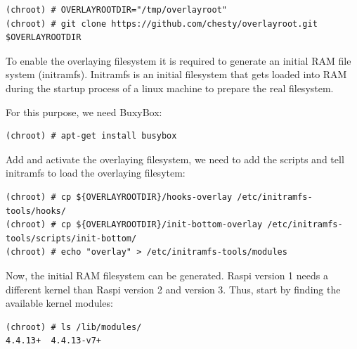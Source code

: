 \begin{lstlisting}[]
(chroot) # OVERLAYROOTDIR="/tmp/overlayroot"
(chroot) # git clone https://github.com/chesty/overlayroot.git $OVERLAYROOTDIR
\end{lstlisting}
\FloatBarrier
\vspace{-5mm}

To enable the overlaying filesystem it is required to generate an initial \ac{RAM}
file system (initramfs). Initramfs is an initial filesystem that gets loaded into
\ac{RAM} during the startup process of a linux machine to prepare the real
filesystem.

For this purpose, we need BuxyBox:

\begin{lstlisting}[]
(chroot) # apt-get install busybox
\end{lstlisting}
\FloatBarrier
\vspace{-5mm}

Add and activate the overlaying filesystem, we need to add the scripts and tell initramfs
to load the overlaying filesytem:

\begin{lstlisting}[]
(chroot) # cp ${OVERLAYROOTDIR}/hooks-overlay /etc/initramfs-tools/hooks/
(chroot) # cp ${OVERLAYROOTDIR}/init-bottom-overlay /etc/initramfs-tools/scripts/init-bottom/
(chroot) # echo "overlay" > /etc/initramfs-tools/modules
\end{lstlisting}
\FloatBarrier
\vspace{-5mm}

Now, the initial \ac{RAM} filesystem can be generated. \ac{Raspi} version 1
needs a different kernel than \ac{Raspi} version 2 and version 3. Thus, start
by finding the available kernel modules:


\begin{lstlisting}[]
(chroot) # ls /lib/modules/
4.4.13+  4.4.13-v7+
\end{lstlisting}
\FloatBarrier
\vspace{-5mm}

